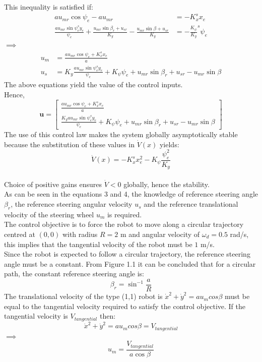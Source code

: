 \documentclass{article}
\begin{document}
 This inequality is satisfied if:
  \begin{align}
au_{mr}\cos\psi_{e}-au_{mr}&=-K_{x} ^sx_{e}\\
\frac{au_{mr}\sin \psi_{e} ^{s}y_{e}}{\psi_{e}}+\frac{u_{mr}\sin \beta_{r}+u_{sr}}{K_y}-\frac{u_{mr}\sin \beta +u_{sr}}{K_y}&=-\frac{K_{\psi}}{K_{y}}^{s}\psi_{e}
 \end{align}
 $\implies$
 \begin{align}
u_{m}&=\frac{au_{mr}\cos \psi_{e}+K_x ^{s}x_e}{a}\\
u_{s}&=K_{y}\frac{au_{mr}\sin \psi_e ^sy_e}{\psi_e}+K_{\psi}\psi_{e}+u_{mr}\sin\beta_{r}+u_{sr}-u_{mr}\sin \beta 
 \end{align}
The above equations yield the value of the control inputs.\\
Hence,
\[\textbf{u}=\begin{bmatrix}
\frac{au_{mr}\cos \psi_{e}+K_x ^{s}x_e}{a}\\
\frac{K_{y}au_{mr}\sin \psi_e ^sy_e}{\psi_e}+K_{\psi}\psi_{e}+u_{mr}\sin\beta_{r}+u_{sr}-u_{mr}\sin \beta 
 \end{bmatrix} \] 
The use of this control law makes the system globally asymptotically stable because the substitution of these values in $\dot{V}(x)$ yields:\\
$$\dot{V}(x)=-K_{x}^{s}x_{e}^2-K_{\psi}\frac{\psi_{e}^2}{K_{y}}$$\\
Choice of positive gains ensures $\dot{V}<0$ globally, hence the stability.\\
As can be seen in the equations 3 and 4, the knowledge of reference steering angle $\beta_r$, the reference steering angular velocity $u_{s}$ and the reference translational velocity of the steering wheel $u_{m}$ is required.\\
The control objective is to force the robot to move along a circular trajectory centred at $(0,0)$ with radius $R=2$ m and angular velocity of $\omega_{d}=0.5$ rad/s, this implies that the tangential velocity of the robot must be $1$ m/s.\\
Since the robot is expected to follow a circular trajectory, the reference steering angle must be a constant. From Figure 1.1 it can be concluded that for a circular path, the constant reference steering angle is: $$\beta_r=\sin^{-1}\frac{a}{R}$$
The translational velocity of the type (1,1) robot is $\dot{x}^{2}+\dot{y}^2=au_{m}cos \beta$ must be equal to the tangential velocity required to satisfy the control objective. If the tangential velocity is $V_{tangential}$ then:
$$\dot{x}^{2}+\dot{y}^2=au_{m}cos \beta=V_{tangential}$$
$\implies$
$$u_{m}=\frac{V_{tangential}}{a\cos\beta}$$ 
\end{document}
